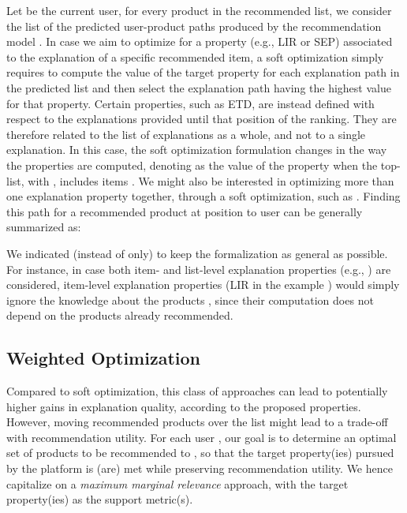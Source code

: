 \documentclass[sigconf]{acmart}
\begin{document}
Let  be the current user, for every product  in the recommended list, we consider the list  of the predicted user-product paths produced by the recommendation model .
In case we aim to optimize for a property  (e.g., LIR or SEP) associated to the explanation of a specific recommended item, a soft optimization simply requires to compute the value of the target property for each explanation path in the predicted list and then select the explanation path having the highest value for that property.
Certain properties, such as ETD, are instead defined with respect to the explanations provided until that position of the ranking.
They are therefore related to the list of explanations as a whole, and not to a single explanation.  
In this case, the soft optimization formulation changes in the way the properties are computed, denoting as  the value of the property  when the top- list, with , includes items . 
We might also be interested in optimizing more than one explanation property together, through a soft optimization, such as . 
Finding this path for a recommended product  at position  to user  can be generally summarized as: 

\vspace{-2mm}


{\color {black} We indicated  (instead of  only) to keep the formalization as general as possible. For instance, in case both item- and list-level explanation properties (e.g., ) are considered, item-level explanation properties (LIR in the example ) would simply ignore the knowledge about the products , since their computation does not depend on the products already recommended. }

\subsection{Weighted Optimization}
Compared to soft optimization, this class of approaches can lead to potentially higher gains in explanation quality, according to the proposed properties. 
However, moving recommended products over the list might lead to a trade-off with recommendation utility. 
For each user , our goal is to determine an optimal set  of  products to be recommended to , so that the target property(ies) pursued by the platform is (are) met while preserving recommendation utility. 
We hence capitalize on a \emph{maximum marginal relevance} approach, with the target property(ies) as the support metric(s). 
\end{document}
